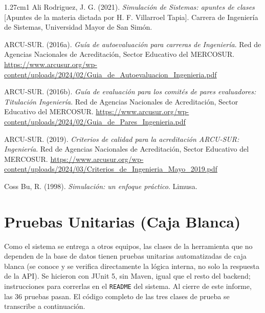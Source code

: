 \documentclass[12pt, a4paper]{article}
\begin{document}
\begin{hangparas}{1.27cm}{1}
Ali Rodriguez, J. G. (2021). \textit{Simulación de Sistemas: apuntes de
clases} [Apuntes de la materia dictada por H. F. Villarroel Tapia].
Carrera de Ingeniería de Sistemas, Universidad Mayor de San Simón.

ARCU-SUR. (2016a). \textit{Guía de autoevaluación para carreras de
Ingeniería}. Red de Agencias Nacionales de Acreditación, Sector Educativo
del MERCOSUR.
\url{https://www.arcusur.org/wp-content/uploads/2024/02/Guia_de_Autoevaluacion_Ingenieria.pdf}

ARCU-SUR. (2016b). \textit{Guía de evaluación para los comités de pares
evaluadores: Titulación Ingeniería}. Red de Agencias Nacionales de
Acreditación, Sector Educativo del MERCOSUR.
\url{https://www.arcusur.org/wp-content/uploads/2024/02/Guia_de_Pares_Ingenieria.pdf}

ARCU-SUR. (2019). \textit{Criterios de calidad para la acreditación
ARCU-SUR: Ingeniería}. Red de Agencias Nacionales de Acreditación,
Sector Educativo del MERCOSUR.
\url{https://www.arcusur.org/wp-content/uploads/2024/03/Criterios_de_Ingenieria_Mayo_2019.pdf}

Coss Bu, R. (1998). \textit{Simulación: un enfoque práctico}. Limusa.
\end{hangparas}

\appendix

\section{Pruebas Unitarias (Caja Blanca)}\label{anexo:pruebas}

Como el sistema se entrega a otros equipos, las clases de la herramienta
que no dependen de la base de datos tienen pruebas unitarias automatizadas
de caja blanca (se conoce y se verifica directamente la lógica interna, no
solo la respuesta de la API). Se hicieron con JUnit 5, sin Maven, igual que
el resto del backend; instrucciones para correrlas en el \texttt{README} del
sistema. Al cierre de este informe, las 36 pruebas pasan. El código completo
de las tres clases de prueba se transcribe a continuación.






\end{document}
